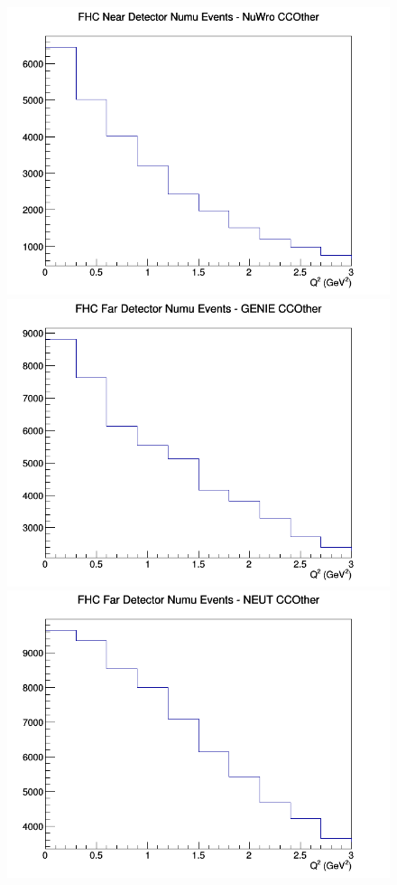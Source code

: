 \documentclass[12pt]{article}
\begin{document}
\begin{figure}[h]
\includegraphics[width=\linewidth]{eff_Q2/FGT/CCOther_FHC_ND_numu_Q2_NuWro.png}
\endminipage
\newline
{}
\includegraphics[width=\linewidth]{eff_Q2/FGT/CCOther_FHC_FD_numu_Q2_GENIE.png}
\endminipage
{}
\includegraphics[width=\linewidth]{eff_Q2/FGT/CCOther_FHC_FD_numu_Q2_NEUT.png}

\end{figure}
\end{document}
